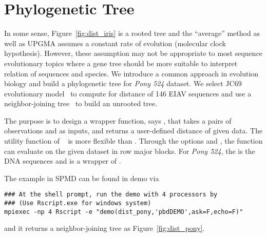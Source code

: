 

\section{Phylogenetic Tree}

In some sense, Figure~\ref{fig:dist_iris} is a rooted tree and the
``average'' method as well as UPGMA assumes a constant rate of evolution
(molecular clock hypothesis). However, these assumption may not be
appropriate to most sequence evolutionary topics where a gene tree should
be more suitable to interpret relation of sequences and species.
We introduce a common approach in evolution biology and build a
phylogenetic tree for {\it Pony 524} dataset.
We select JC69 evolutionary model~\citep{Jukes1969}
to compute for distance of 146 EIAV sequences and
use a neighbor-joining tree~\citep{Saitou1987} to build an unrooted tree.

The purpose is to design a wrapper function, says ,
that takes a pairs of observations  and  as inputs, and
returns a user-defined distance of given data.
The utility function 
of ~\citep{Chen2012pbdMPIpackage}
is more flexible than .
Through the options  and , the
function can evaluate  on the given dataset  in
row major blocks.
For {\it Pony 524}, the  is the DNA sequences and 
is a wrapper of .

The example in SPMD can be found in demo via
\begin{lstlisting}
### At the shell prompt, run the demo with 4 processors by
### (Use Rscript.exe for windows system)
mpiexec -np 4 Rscript -e "demo(dist_pony,'pbdDEMO',ask=F,echo=F)"
\end{lstlisting}
and it returns a neighbor-joining tree as Figure~\ref{fig:dist_pony}.



